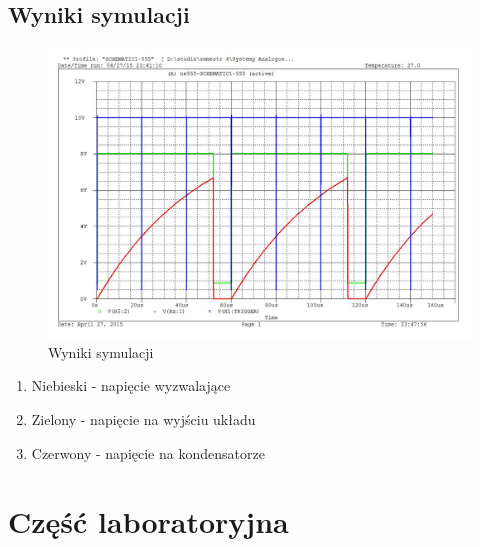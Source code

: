 \documentclass[a4paper,12pt]{article}
\begin{document}
\subsection {Wyniki symulacji}   
\begin{figure}[h]
  \center 
  \includegraphics[width=1.2\textwidth]{sim}
  \caption{Wyniki symulacji}
\end{figure}
\begin{enumerate} 
\item Niebieski - napięcie wyzwalające  
\item Zielony - napięcie na wyjściu układu    
\item Czerwony - napięcie na kondensatorze
\end{enumerate}
\pagebreak
\section{Część laboratoryjna}
\end{document}

